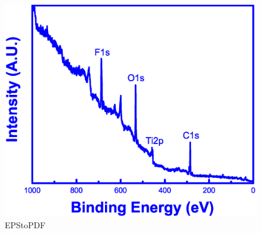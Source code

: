 \begin{figure}[H]
        \includegraphics[width=\textwidth]{XPS}
        \caption{EPStoPDF}
        \label{fig:Ti-6242 Williamson-Hall Plot}
\end{figure}